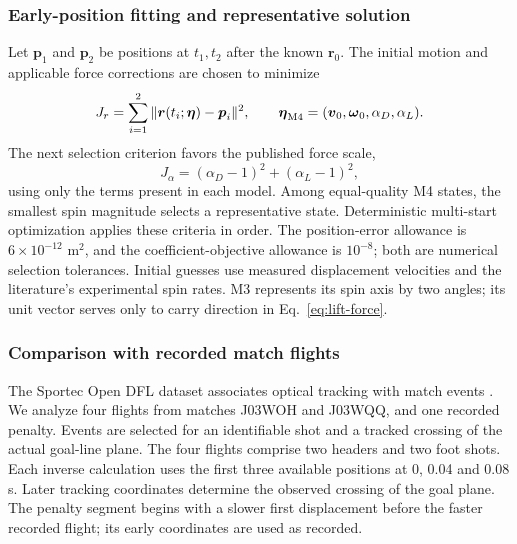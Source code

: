 \documentclass[12pt,letterpaper]{article}
\begin{document}
\subsubsection{Early-position fitting and representative solution}
Let $\boldsymbol p_1$ and $\boldsymbol p_2$ be positions at $t_1,t_2$ after the known $\boldsymbol r_0$. The initial motion and applicable force corrections are chosen to minimize
\begin{equation}
J_r=\sum_{i=1}^{2}\|\boldsymbol r(t_i;\boldsymbol\eta)-\boldsymbol p_i\|^2,\qquad
\boldsymbol\eta_{\rm M4}=(\boldsymbol v_0,\boldsymbol\omega_0,\alpha_D,\alpha_L).
\end{equation}
The next selection criterion favors the published force scale,
\begin{equation}J_\alpha=(\alpha_D-1)^2+(\alpha_L-1)^2,\end{equation}
using only the terms present in each model. Among equal-quality M4 states, the smallest spin magnitude selects a representative state. Deterministic multi-start optimization applies these criteria in order. The position-error allowance is $6\times10^{-12}$ m$^2$, and the coefficient-objective allowance is $10^{-8}$; both are numerical selection tolerances. Initial guesses use measured displacement velocities and the literature's experimental spin rates. M3 represents its spin axis by two angles; its unit vector serves only to carry direction in Eq.~\eqref{eq:lift-force}.

\subsubsection{Comparison with recorded match flights}\label{sec:real-validation}
The Sportec Open DFL dataset associates optical tracking with match events \cite{bassek,dataset}. We analyze four flights from matches J03WOH and J03WQQ, and one recorded penalty. Events are selected for an identifiable shot and a tracked crossing of the actual goal-line plane. The four flights comprise two headers and two foot shots. Each inverse calculation uses the first three available positions at 0, 0.04 and 0.08 s. Later tracking coordinates determine the observed crossing of the goal plane. The penalty segment begins with a slower first displacement before the faster recorded flight; its early coordinates are used as recorded.
\end{document}

